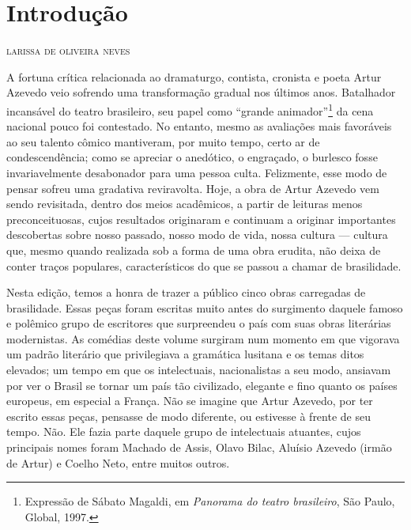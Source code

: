 \renewcommand{\fala}[1]{\noindent\quad\textsc{#1} ---}

\chapter[Introdução, \emph{por Larissa de Oliveira Neves}]{Introdução}

\begin{flushright}
\textsc{larissa de oliveira neves}
\end{flushright}

\noindent{}A fortuna crítica relacionada ao dramaturgo, contista, cronista e poeta
Artur Azevedo veio sofrendo uma transformação gradual nos últimos anos.
Batalhador incansável do teatro brasileiro, seu papel como “grande
animador”\footnote{ Expressão de Sábato Magaldi, em \textit{Panorama do teatro
brasileiro}, São Paulo, Global, 1997.} da cena nacional pouco foi contestado. No
entanto, mesmo as avaliações mais favoráveis ao seu talento cômico
mantiveram, por muito tempo, certo ar de condescendência; como se
apreciar o anedótico, o engraçado, o burlesco fosse invariavelmente
desabonador para uma pessoa culta. Felizmente, esse modo de pensar
sofreu uma gradativa reviravolta. Hoje, a obra de Artur Azevedo vem
sendo revisitada, dentro dos meios acadêmicos, a partir de leituras
menos preconceituosas, cujos resultados originaram e continuam a
originar importantes descobertas sobre nosso passado, nosso modo
de vida, nossa cultura --- cultura que, mesmo quando
realizada sob a forma de uma obra erudita, não deixa de conter traços
populares, característicos do que se passou a chamar de brasilidade.

Nesta edição, temos a honra de trazer a público cinco obras carregadas
de brasilidade. Essas peças foram escritas muito antes do surgimento
daquele famoso e polêmico grupo de escritores que surpreendeu o país
com suas obras literárias modernistas. As comédias deste volume
surgiram num momento em que vigorava um padrão literário que
privilegiava a gramática lusitana e os temas ditos elevados; um tempo em
que os intelectuais, nacionalistas a seu modo, ansiavam por ver o
Brasil se tornar um país tão civilizado, elegante e fino quanto os
países europeus, em especial a França. Não se imagine que Artur
Azevedo, por ter escrito essas peças, pensasse de modo diferente, ou
estivesse à frente de seu tempo. Não. Ele fazia parte daquele grupo de
intelectuais atuantes, cujos principais nomes foram Machado de Assis,
Olavo Bilac, Aluísio Azevedo (irmão de Artur) e Coelho Neto, entre
muitos outros. 

